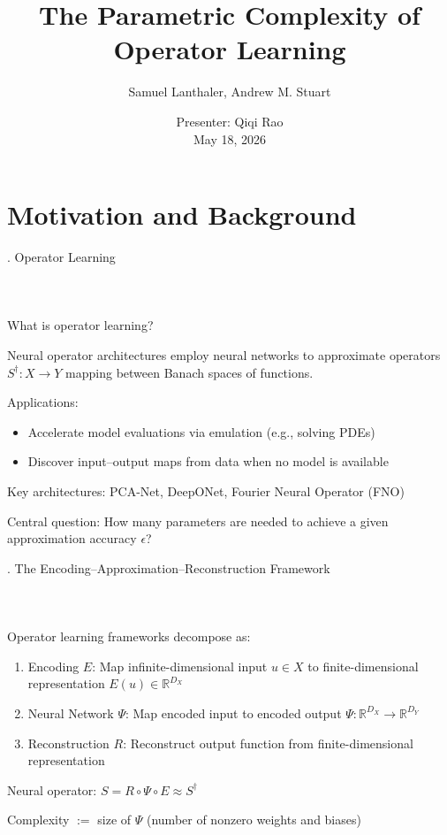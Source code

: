 \documentclass{beamer}
\title{{\Large The Parametric Complexity of Operator Learning}}
\author{Samuel Lanthaler, Andrew M. Stuart}
\date{ \vspace{15pt}
{\large Presenter: Qiqi Rao}\\
\medskip
May 18, 2026
}
\def\b{\color{blue}}
\def\r{\color{red}}
\begin{document}
\maketitle


\section{{\Large Motivation and Background}}

\begin{frame}[fragile]{\thesection. Operator Learning}
\framesubtitle{$\quad$}
{\Large {\b What is operator learning?}}
\medskip

{\Large Neural operator architectures employ neural networks to approximate operators $ S^\dagger : X \to Y $ mapping between Banach spaces of functions.}
\medskip

{\Large {\b Applications:}
\begin{itemize}
    \item Accelerate model evaluations via emulation (e.g., solving PDEs)
    \item Discover input--output maps from data when no model is available
\end{itemize}
}
\medskip

{\Large {\b Key architectures:} PCA-Net, DeepONet, Fourier Neural Operator (FNO)}
\medskip

{\Large {\b Central question:} {\r How many parameters are needed to achieve a given approximation accuracy $ \epsilon $?}}

\end{frame}

\begin{frame}{\thesection. The Encoding--Approximation--Reconstruction Framework}
\framesubtitle{$\quad$}
{\Large Operator learning frameworks decompose as:}
\medskip

{\Large 
\begin{enumerate}
    \item {\b Encoding $ E $}: Map infinite-dimensional input $ u \in X $ to finite-dimensional representation $ E(u) \in \mathbb{R}^{D_X} $
    \item {\b Neural Network $ \Psi $}: Map encoded input to encoded output $ \Psi : \mathbb{R}^{D_X} \to \mathbb{R}^{D_Y} $
    \item {\b Reconstruction $ R $}: Reconstruct output function from finite-dimensional representation
\end{enumerate}
}
\medskip

{\Large {\b Neural operator}: $ S = R \circ \Psi \circ E \approx S^\dagger $}
\medskip

{\Large {\b Complexity} $ := $ size of $ \Psi $ (number of nonzero weights and biases)}

\end{frame}
\end{document}
